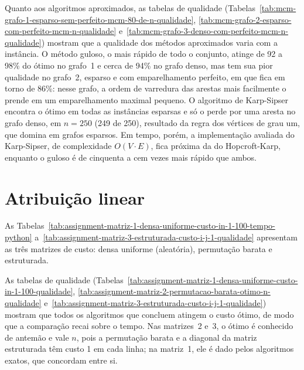 Quanto aos algoritmos aproximados, as tabelas de qualidade
(Tabelas~\ref{tab:mcm-grafo-1-esparso-sem-perfeito-mcm-80-de-n-qualidade},
\ref{tab:mcm-grafo-2-esparso-com-perfeito-mcm-n-qualidade}
e~\ref{tab:mcm-grafo-3-denso-com-perfeito-mcm-n-qualidade}) mostram que a
qualidade dos métodos aproximados varia com a instância. O método guloso, o mais rápido de todo o conjunto, atinge de 92 a 98\%
do ótimo no grafo~1 e cerca de 94\% no grafo denso, mas tem sua pior qualidade no
grafo~2, esparso e com emparelhamento perfeito, em que fica em torno de 86\%: nesse
grafo, a ordem de varredura das arestas mais facilmente o prende em um
emparelhamento maximal pequeno. O algoritmo de Karp-Sipser encontra o ótimo em
todas as instâncias esparsas e só o perde por uma aresta no grafo denso, em
$n = 250$ (249 de 250), resultado da regra dos vértices de grau um, que domina
em grafos esparsos. Em tempo, porém, a implementação avaliada do Karp-Sipser, de
complexidade $O(V \cdot E)$, fica próxima da do Hopcroft-Karp, enquanto o guloso é
de cinquenta a cem vezes mais rápido que ambos.

\section{Atribuição linear}
\label{sec:res_assignment}

As Tabelas~\ref{tab:assignment-matriz-1-densa-uniforme-custo-in-1-100-tempo-python}
a~\ref{tab:assignment-matriz-3-estruturada-custo-i-j-1-qualidade} apresentam as
três matrizes de custo: densa uniforme (aleatória), permutação barata e
estruturada.








As tabelas de qualidade
(Tabelas~\ref{tab:assignment-matriz-1-densa-uniforme-custo-in-1-100-qualidade},
\ref{tab:assignment-matriz-2-permutacao-barata-otimo-n-qualidade}
e~\ref{tab:assignment-matriz-3-estruturada-custo-i-j-1-qualidade}) mostram que
todos os algoritmos que concluem atingem o custo ótimo, de modo que a comparação
recai sobre o tempo. Nas matrizes~2 e~3, o ótimo é conhecido de antemão e vale $n$,
pois a permutação barata e a diagonal da matriz estruturada têm custo 1 em cada
linha; na matriz~1, ele é dado pelos algoritmos exatos, que concordam entre si.

